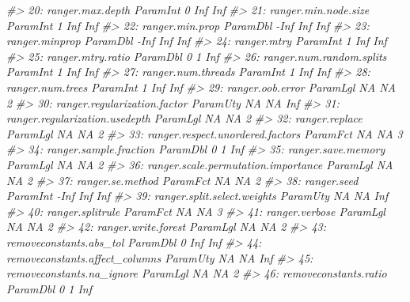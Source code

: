 \documentclass[
  11pt,
  ignorenonframetext,
  dvipsnames,UTF8]{beamer}
\newenvironment{Shaded}{\begin{snugshade}}{\end{snugshade}}
\newcommand{\CommentTok}[1]{\textcolor[rgb]{0.56,0.35,0.01}{\textit{#1}}}
\begin{document}
\begin{frame}[fragile]{}
\begin{Shaded}
\begin{Highlighting}[]
\CommentTok{\#\textgreater{} 20:                    ranger.max.depth ParamInt     0   Inf     Inf}
\CommentTok{\#\textgreater{} 21:                ranger.min.node.size ParamInt     1   Inf     Inf}
\CommentTok{\#\textgreater{} 22:                     ranger.min.prop ParamDbl  {-}Inf   Inf     Inf}
\CommentTok{\#\textgreater{} 23:                      ranger.minprop ParamDbl  {-}Inf   Inf     Inf}
\CommentTok{\#\textgreater{} 24:                         ranger.mtry ParamInt     1   Inf     Inf}
\CommentTok{\#\textgreater{} 25:                   ranger.mtry.ratio ParamDbl     0     1     Inf}
\CommentTok{\#\textgreater{} 26:            ranger.num.random.splits ParamInt     1   Inf     Inf}
\CommentTok{\#\textgreater{} 27:                  ranger.num.threads ParamInt     1   Inf     Inf}
\CommentTok{\#\textgreater{} 28:                    ranger.num.trees ParamInt     1   Inf     Inf}
\CommentTok{\#\textgreater{} 29:                    ranger.oob.error ParamLgl    NA    NA       2}
\CommentTok{\#\textgreater{} 30:        ranger.regularization.factor ParamUty    NA    NA     Inf}
\CommentTok{\#\textgreater{} 31:      ranger.regularization.usedepth ParamLgl    NA    NA       2}
\CommentTok{\#\textgreater{} 32:                      ranger.replace ParamLgl    NA    NA       2}
\CommentTok{\#\textgreater{} 33:    ranger.respect.unordered.factors ParamFct    NA    NA       3}
\CommentTok{\#\textgreater{} 34:              ranger.sample.fraction ParamDbl     0     1     Inf}
\CommentTok{\#\textgreater{} 35:                  ranger.save.memory ParamLgl    NA    NA       2}
\CommentTok{\#\textgreater{} 36: ranger.scale.permutation.importance ParamLgl    NA    NA       2}
\CommentTok{\#\textgreater{} 37:                    ranger.se.method ParamFct    NA    NA       2}
\CommentTok{\#\textgreater{} 38:                         ranger.seed ParamInt  {-}Inf   Inf     Inf}
\CommentTok{\#\textgreater{} 39:         ranger.split.select.weights ParamUty    NA    NA     Inf}
\CommentTok{\#\textgreater{} 40:                    ranger.splitrule ParamFct    NA    NA       3}
\CommentTok{\#\textgreater{} 41:                      ranger.verbose ParamLgl    NA    NA       2}
\CommentTok{\#\textgreater{} 42:                 ranger.write.forest ParamLgl    NA    NA       2}
\CommentTok{\#\textgreater{} 43:             removeconstants.abs\_tol ParamDbl     0   Inf     Inf}
\CommentTok{\#\textgreater{} 44:      removeconstants.affect\_columns ParamUty    NA    NA     Inf}
\CommentTok{\#\textgreater{} 45:           removeconstants.na\_ignore ParamLgl    NA    NA       2}
\CommentTok{\#\textgreater{} 46:               removeconstants.ratio ParamDbl     0     1     Inf}

\end{Highlighting}
\end{Shaded}
\end{frame}
\end{document}
